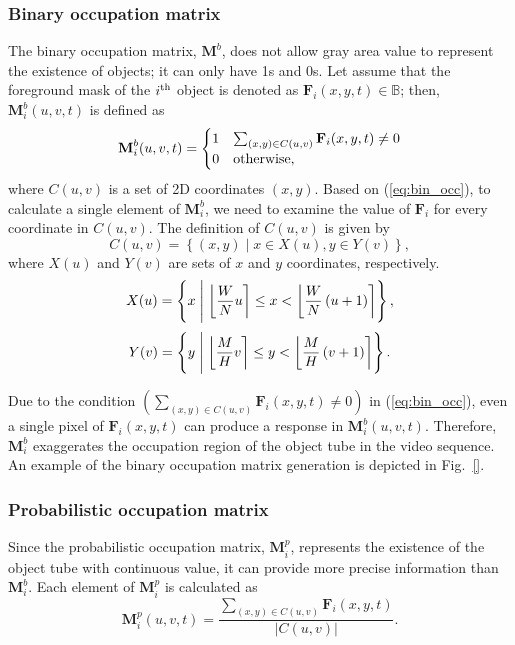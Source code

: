 \documentclass[11pt]{hyu_thesis}
\begin{document}
\subsubsection{Binary occupation matrix}
\label{sec:proposed:occ:binary}
The binary occupation matrix, $\textbf{M}^b$, does not allow gray area value to represent the existence of objects; it can only have 1s and 0s. Let assume that the foreground mask of the $i^{\rm{th}}$ object is denoted as $\textbf{F}_i(x,y,t) \in \mathbb{B}$; then, $\textbf{M}_i^b(u,v,t)$ is defined as
\begin{equation}
\label{eq:bin_occ}
\textbf{M}_i^b(u,v,t)=
\begin{cases}
1 & \sum_{(x,y) \in C(u,v)}\textbf{F}_i(x,y,t) \neq 0 \\
0 & \rm{otherwise},
\end{cases}
\end{equation}
where $C(u,v)$ is a set of 2D coordinates $(x,y)$. Based on (\ref{eq:bin_occ}), to calculate a single element of $\textbf{M}_i^b$, we need to examine the value of $\textbf{F}_i$ for every coordinate in $C(u,v)$. The definition of $C(u,v)$ is given by
\begin{equation}
C(u,v)=\left\{ (x,y) \mid x \in X(u), y \in Y(v) \right\},
\end{equation}
where $X(u)$ and $Y(v)$ are sets of $x$ and $y$ coordinates, respectively.
\begin{equation}
X(u)=\left\{ x \;\middle|\; \round*{\frac{W}{N}u} \leq x < \round*{\frac{W}{N}\left( u + 1 \right)} \right\},
\end{equation}
\begin{equation}
Y(v)=\left\{ y \;\middle|\; \round*{\frac{M}{H}v} \leq y < \round*{\frac{M}{H}\left( v + 1 \right)} \right\}.
\end{equation}

Due to the condition $\left( \sum_{(x,y) \in C(u,v)}\textbf{F}_i(x,y,t) \neq 0 \right)$ in (\ref{eq:bin_occ}), even a single pixel of $\textbf{F}_i(x,y,t)$ can produce a response in $\textbf{M}_i^b(u,v,t)$. Therefore, $\textbf{M}_i^b$ exaggerates the occupation region of the object tube in the video sequence. An example of the binary occupation matrix generation is depicted in Fig.~\ref{}.


\subsubsection{Probabilistic occupation matrix}
\label{sec:proposed:occ:prob}
Since the probabilistic occupation matrix, $\textbf{M}_i^p$, represents the existence of the object tube with continuous value, it can provide more precise information than $\textbf{M}_i^b$. Each element of $\textbf{M}_i^p$ is calculated as
\begin{equation}
\label{eq:prob_occ}
\textbf{M}_i^p(u,v,t)= \frac{\sum_{(x,y) \in C(u,v)}\textbf{F}_i(x,y,t)}{|C(u,v)|}.
\end{equation}
\end{document}
